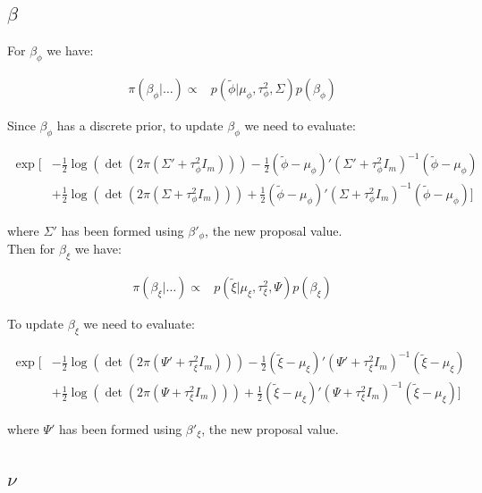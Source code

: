 \documentclass{article}
\begin{document}
\subsection{$\beta$}

For $\beta_\phi$ we have:

\begin{align*}
\pi(\beta_\phi | \dots ) \propto & p(\tilde{\phi} | \mu_\phi, \tau^2_\phi, \Sigma) p(\beta_\phi)
\end{align*}

Since $\beta_\phi$ has a discrete prior, to update $\beta_\phi$ we need to evaluate:

\begin{align}
\exp \Big[ & - \frac{1}{2}  \log(\det(2 \pi (\Sigma' + \tau^2_\phi I_m))) -\frac{1}{2} (\tilde{\phi} - \mu_\phi)' (\Sigma' + \tau^2_\phi I_m)^{-1} (\tilde{\phi} - \mu_\phi) \nonumber \\
& + \frac{1}{2} \log(\det(2 \pi (\Sigma + \tau^2_\phi I_m))) + \frac{1}{2} (\tilde{\phi} - \mu_\phi)' (\Sigma + \tau^2_\phi I_m)^{-1} (\tilde{\phi} - \mu_\phi) \Big] \label{eq:2b1}
\end{align}

where $\Sigma'$ has been formed using $\beta'_\phi$, the new proposal value. \\

Then for $\beta_\xi$ we have:

\begin{align*}
\pi(\beta_\xi | \dots ) \propto & p(\tilde{\xi} | \mu_\xi, \tau^2_\xi, \Psi) p(\beta_\xi)
\end{align*}

To update $\beta_\xi$ we need to evaluate:

\begin{align}
\exp \Big[ & -\frac{1}{2} \log(\det(2 \pi (\Psi' + \tau^2_\xi I_m))) -\frac{1}{2} (\tilde{\xi} - \mu_\xi)' (\Psi' + \tau^2_\xi I_m)^{-1} (\tilde{\xi} - \mu_\xi) \nonumber \\
& + \frac{1}{2} \log(\det(2 \pi (\Psi + \tau^2_\xi I_m)))+ \frac{1}{2} (\tilde{\xi} - \mu_\xi)' (\Psi + \tau^2_\xi I_m)^{-1} (\tilde{\xi} - \mu_\xi) \Big] \label{eq:2b2}
\end{align}

where $\Psi'$ has been formed using $\beta'_\xi$, the new proposal value. \\

\subsection{$\nu$}
\end{document}
